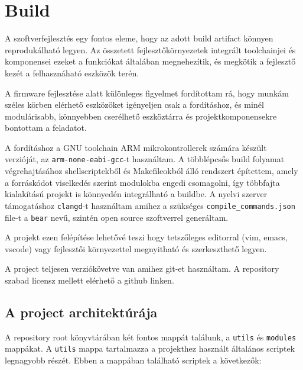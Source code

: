 
\section{Build}

A szoftverfejlesztés egy fontos eleme, hogy az adott build artifact könnyen
reprodukálható legyen. Az összetett fejlesztőkörnyezetek integrált toolchainjei
és komponensei ezeket a funkciókat általában megnehezítik, és megkötik a
fejlesztő kezét a felhasznáható eszközök terén.

A firmware fejlesztése alatt különleges figyelmet fordítottam rá, hogy munkám
széles körben elérhető eszközöket igényeljen csak a fordításhoz, és minél
modulárisabb, könnyebben cserélhető eszköztárra és projektkomponensekre bontottam
a feladatot.

A fordításhoz a GNU toolchain ARM mikrokontrollerek számára készült verzióját, az
\verb|arm-none-eabi-gcc|-t használtam. A többlépcsős build folyamat
végrehajtásához shellscriptekből és Makefileokból álló rendszert építettem, amely
a forráskódot viselkedés szerint modulokba engedi csomagolni, így többfajta
kialakítású projekt is könnyedén integrálható a buildbe. A nyelvi szerver
támogatáshoz \verb|clangd|-t használtam amihez a szükséges
\verb|compile_commands.json| file-t a \verb|bear| nevű, szintén open source
szoftverrel generáltam.

A projekt ezen felépítése lehetővé teszi hogy tetszőleges editorral (vim, emacs,
vscode) vagy fejlesztői környezettel megnyitható és szerkeszthető legyen.

A project teljesen verziókövetve van amihez git-et használtam. A repository
szabad licensz mellett elérhető a github linken\cite{RpirobotGitrepo}. 

\subsection{A project architektúrája}

A repository root könyvtárában két fontos mappát találunk, a \verb|utils| és
\verb|modules| mappákat. A \verb|utils| mappa tartalmazza a projekthez használt
általános scriptek legnagyobb részét. Ebben a mappában található scriptek a
következők:

